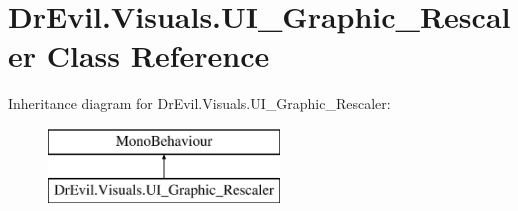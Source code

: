 \hypertarget{class_dr_evil_1_1_visuals_1_1_u_i___graphic___rescaler}{}\section{Dr\+Evil.\+Visuals.\+U\+I\+\_\+\+Graphic\+\_\+\+Rescaler Class Reference}
\label{class_dr_evil_1_1_visuals_1_1_u_i___graphic___rescaler}
Inheritance diagram for Dr\+Evil.\+Visuals.\+U\+I\+\_\+\+Graphic\+\_\+\+Rescaler\+:\begin{figure}[H]
\begin{center}
\leavevmode
\includegraphics[height=2.000000cm]{class_dr_evil_1_1_visuals_1_1_u_i___graphic___rescaler}
\end{center}
\end{figure}
